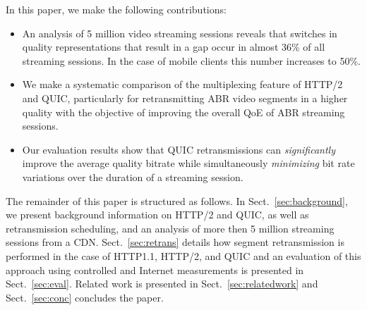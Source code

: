 In this paper, we make the following contributions:
\vspace{-5pt}
\begin{itemize}
\item An analysis of 5 million video streaming sessions reveals that switches in quality representations that result in a gap occur in almost 36\% of all streaming sessions. In the case of mobile clients this number increases to 50\%.
\item We make a systematic comparison of the multiplexing feature of HTTP/2 and QUIC, particularly for retransmitting ABR video segments in a higher quality with the objective of improving the overall QoE of ABR streaming sessions.
\item Our evaluation results show that QUIC retransmissions can \textit{significantly} improve the average quality bitrate while simultaneously \textit{minimizing} bit rate variations over the duration of a streaming session.
\end{itemize}


The remainder of this paper is structured as follows. In Sect.~\ref{sec:background}, we present background information on HTTP/2 and QUIC, as well as retransmission scheduling, and an analysis of more then 5 million streaming sessions from a CDN. Sect.~\ref{sec:retrans} details how segment retransmission is performed in the case of HTTP1.1, HTTP/2, and QUIC and an evaluation of this approach using controlled and Internet measurements is presented in Sect.~\ref{sec:eval}. Related work is presented in Sect.~\ref{sec:relatedwork} and Sect.~\ref{sec:conc} concludes the paper.